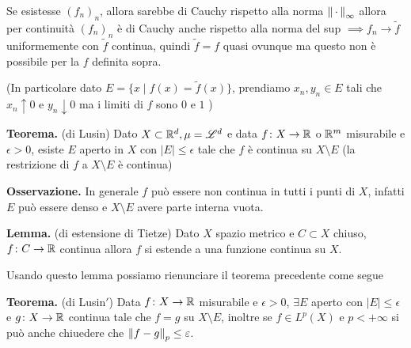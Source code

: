 \documentclass[a4paper, 12pt]{report}
\begin{document}
Se esistesse $(f_n)_n$, allora sarebbe di Cauchy rispetto alla norma $\left\lVert \,\cdot\, \right\rVert_\infty$ allora per continuità $(f_n)_n$ è di Cauchy anche rispetto alla norma del sup $\implies f_n \to \tilde f$ uniformemente con $\tilde f$ continua, quindi $\tilde f = f$ quasi ovunque ma questo non è possibile per la $f$ definita sopra.

(In particolare dato $E = \{ x \mid f(x) = \tilde f(x) \}$, prendiamo $x_n, y_n \in E$ tali che $x_n \uparrow 0$ e $y_n \downarrow 0$ ma i limiti di $f$ sono $0$ e $1$ \absurd)

\textbf{Teorema.} (di Lusin)
Dato $X \subset \mathbb R^d, \mu = \mathscr L^d$ e data $f \colon X \to \mathbb R$ o $\mathbb R^m$ misurabile e $\epsilon > 0$, esiste $E$ aperto in $X$ con $|E| \leq \epsilon$ tale che $f$ è continua su $X \setminus E$ (la restrizione di $f$ a $X \setminus E$ è continua)

\textbf{Osservazione.} 
In generale $f$ può essere non continua in tutti i punti di $X$, infatti $E$ può essere denso e $X \setminus E$ avere parte interna vuota.

\textbf{Lemma.} (di estensione di Tietze) Dato $X$ spazio metrico e $C \subset X$ chiuso, $f \colon C \to \mathbb R$ continua allora $f$ si estende a una funzione continua su $X$.

Usando questo lemma possiamo rienunciare il teorema precedente come segue

\textbf{Teorema.} (di Lusin$'$)
Data $f \colon X \to \mathbb R$ misurabile e $\epsilon > 0$, $\exists E$ aperto con $|E| \leq \epsilon$ e $g \colon X \to \mathbb R$ continua tale che $f = g$ su $X \setminus E$, inoltre se $f \in L^p(X)$ e $p < +\infty$ si può anche chiuedere che $\left\lVert f - g \right\rVert_p \leq \varepsilon$.
\end{document}

